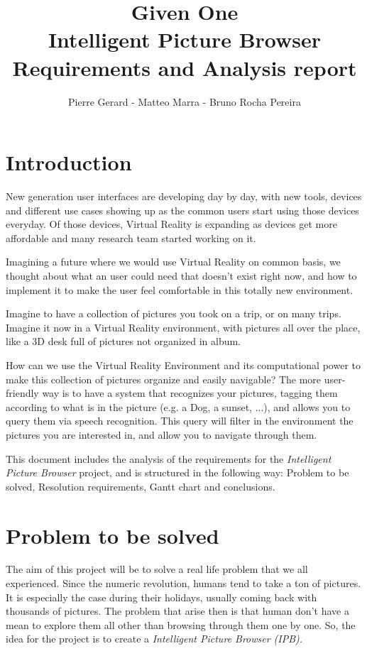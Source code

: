 \documentclass[11pt,a4paper]{article}
\author{Pierre Gerard - Matteo Marra - Bruno Rocha Pereira}
\title{Given One \\ Intelligent Picture Browser \\ Requirements and Analysis report}
\begin{document}
\maketitle

\section{Introduction}
New generation user interfaces are developing day by day, with new tools, devices and different use cases showing up as the common users start using those devices everyday.
Of those devices, Virtual Reality is expanding as devices get more affordable and many research team started working on it. 

Imagining a future where we would use Virtual Reality on common basis, we thought about what an user could need that doesn't exist right now, and how to implement it to make the user feel comfortable in this totally new environment.

Imagine to have a collection of pictures you took on a trip, or on many trips. Imagine it now in a Virtual Reality environment, with pictures all over the place, like a 3D desk full of pictures not organized in album.

How can we use the Virtual Reality Environment and its computational power to make this collection of pictures organize and easily navigable?
The more user-friendly way is to have a system that recognizes your pictures, tagging them according to what is in the picture (e.g. a Dog, a sunset, ...), and allows you to query them via speech recognition. This query will filter in the environment the pictures you are interested in, and allow you to navigate through them.

This document includes the analysis of the requirements for the \textit{Intelligent Picture Browser} project, and is structured in the following way: Problem to be solved, Resolution requirements, Gantt chart and conclusions.

\section{Problem to be solved}

The aim of this project will be to solve a real life problem that we all experienced. Since the numeric revolution, humans tend to take a ton of pictures. It is especially the case during their holidays, usually coming back with thousands of pictures. The problem that arise then is that human don't have a mean to explore them all other than browsing through them one by one. So, the idea for the project is to create a \textit{Intelligent Picture Browser (IPB).}
 
\end{document}

